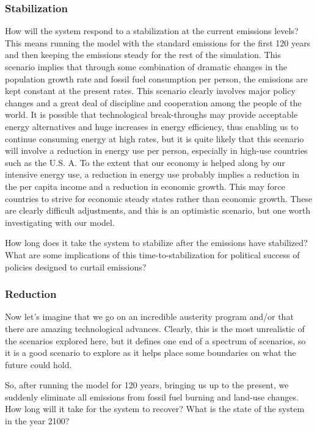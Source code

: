 \documentclass[11pt,letterpaper]{article}
\begin{document}
\subsubsection{Stabilization}
How will the system respond to a stabilization at the current emissions levels? This means running the model with the standard emissions for the first 120 years and then keeping the emissions steady for the rest of the simulation. This scenario implies that through some combination of dramatic changes in the population growth rate and fossil fuel consumption per person, the emissions are kept constant at the present rates. This scenario clearly involves major policy changes and a great deal of discipline and cooperation among the people of the world. It is possible that technological break-throughs may provide acceptable energy alternatives and huge increases in energy efficiency, thus enabling us to continue consuming energy at high rates, but it is quite likely that this scenario will involve a reduction in energy use per person, especially in high-use countries such as the U.S. A. To the extent that our economy is helped along by our intensive energy use, a reduction in energy use probably implies a reduction in the per capita income and a reduction in economic growth. This may force countries to strive for economic steady states rather than economic growth. These are clearly difficult adjustments, and this is an optimistic scenario, but one worth investigating with our model.

How long does it take the system to stabilize after the emissions have stabilized? What are some implications of this time-to-stabilization for political success of policies designed to curtail emissions? 

\subsubsection{Reduction}
Now let's imagine that we go on an incredible austerity program and/or that there are amazing technological advances. Clearly, this is the most unrealistic of the scenarios explored here, but it defines one end of a spectrum of scenarios, so it is a good scenario to explore as it helps place some boundaries on what the future could hold.

So, after running the model for 120 years, bringing us up to the present, we suddenly eliminate all emissions from fossil fuel burning and land-use changes. How long will it take for the system to recover? What is the state of the system in the year 2100? 
\end{document}
